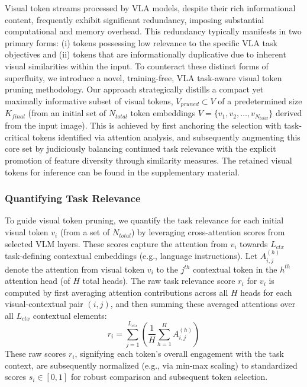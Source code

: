 Visual token streams processed by VLA models, despite their rich informational content, frequently exhibit significant redundancy, imposing substantial computational and memory overhead. This redundancy typically manifests in two primary forms: (i) tokens possessing low relevance to the specific VLA task objectives and (ii) tokens that are informationally duplicative due to inherent visual similarities within the input. To counteract these distinct forms of superfluity, we introduce a novel, training-free, VLA task-aware visual token pruning methodology. Our approach strategically distills a compact yet maximally informative subset of visual tokens, $V_{pruned} \subset V$ of a predetermined size $K_{final}$ (from an initial set of $N_{total}$ token embeddings $V = \{v_1, v_2, \dots, v_{N_{total}}\}$ derived from the input image). This is achieved by first anchoring the selection with task-critical tokens identified via attention analysis, and subsequently augmenting this core set by judiciously balancing continued task relevance with the explicit promotion of feature diversity through similarity measures. The retained visual tokens for inference can be found in the supplementary material.



\subsubsection{Quantifying Task Relevance}


To guide visual token pruning, we quantify the task relevance for each initial visual token $v_i$ (from a set of $N_{total}$) by leveraging cross-attention scores from selected VLM layers. These scores capture the attention from $v_i$ towards $L_{ctx}$ task-defining contextual embeddings (e.g., language instructions). Let $A^{(h)}_{i,j}$ denote the attention from visual token $v_i$ to the $j^{th}$ contextual token in the $h^{th}$ attention head (of $H$ total heads). The raw task relevance score $r_i$ for $v_i$ is computed by first averaging attention contributions across all $H$ heads for each visual-contextual pair $(i,j)$, and then summing these averaged attentions over all $L_{ctx}$ contextual elements:
\begin{equation}
    r_i = \sum_{j=1}^{L_{ctx}} \left( \frac{1}{H} \sum_{h=1}^{H} A^{(h)}_{i,j} \right)
    \label{eq:task_relevance_score_concise}
\end{equation}
These raw scores $r_i$, signifying each token's overall engagement with the task context, are subsequently normalized (e.g., via min-max scaling) to standardized scores $s_i \in [0, 1]$ for robust comparison and subsequent token selection.


